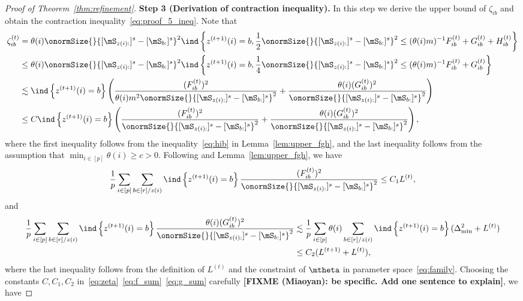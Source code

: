 \documentclass[lettersize,onecolumn,journal]{IEEEtran}
\theoremstyle{definition}
\theoremstyle{definition}
\newcommand{\of}[1]{\left(#1\right)}
\newcommand{\offf}[1]{\left\{#1\right\}}
\def\fixme#1#2{\textbf{\color{red}[FIXME (#1): #2]}}
\begin{document}
\begin{proof}[Proof of Theorem~\ref{thm:refinement}]
    {\bf Step 3 (Derivation of contraction inequality).} In this step we derive the upper bound of $\zeta_{ib}$ and obtain the contraction inequality~\eqref{eq:proof_5_ineq}. Note that 
    \begin{align}
        \zeta_{ib}^{(t)} &= \theta(i) \onormSize{}{ [ \mS_{ z(i):}  ]^s - [ \mS_{b:}  ]^s  }^2 \ind \offf{z^{(t+1)}(i) = b, \frac{1}{2}\onormSize{}{ [ \mS_{z(i):}  ]^s - [ \mS_{b:}  ]^s  }^2 \leq (\theta(i) m)^{-1} F_{ib}^{(t)} + G_{ib}^{(t)} + H_{ib}^{(t)} }\\
        & \leq \theta(i) \onormSize{}{ [ \mS_{ z(i):}  ]^s - [ \mS_{b:}  ]^s  }^2 \ind \offf{z^{(t+1)}(i) = b, \frac{1}{4}\onormSize{}{ [ \mS_{z(i):}  ]^s - [ \mS_{b:}  ]^s  }^2 \leq (\theta(i) m)^{-1} F_{ib}^{(t)} + G_{ib}^{(t)} } \\
        & \lesssim \ind \offf{ z^{(t+1)}(i) = b} \of{  \frac{(F_{ib}^{(t)})^2}{ \theta(i)m^2\onormSize{}{ [ \mS_{z(i):}  ]^s - [ \mS_{b:}  ]^s  }^2} + \frac{\theta(i)(G_{ib}^{(t)})^2}{ \onormSize{}{ [ \mS_{z(i):}  ]^s - [ \mS_{b:}  ]^s  }^2}    }\\
        &\leq C \ind \offf{ z^{(t+1)}(i) = b} \of{  \frac{(F_{ib}^{(t)})^2}{ \onormSize{}{ [ \mS_{z(i):}  ]^s - [ \mS_{b:}  ]^s  }^2} + \frac{\theta(i)(G_{ib}^{(t)})^2}{ \onormSize{}{ [ \mS_{z(i):}  ]^s - [ \mS_{b:}  ]^s  }^2}    },\label{eq:zeta}
    \end{align}
    where the first inequality follows from the inequality~\eqref{eq:hib} in Lemma~\ref{lem:upper_fgh}, and the last inequality follows from the assumption that $\min_{i \in [p]} \theta(i) \geq c>0$. Following \citet[Step 4, Proof of Theorem 2]{han2020exact} and Lemma~\ref{lem:upper_fgh}, we have 
    \begin{align}\label{eq:f_sum}
          \frac{1}{p} \sum_{i \in [p]}\sum_{b \in [r]/z(i)} \ind \offf{ z^{(t+1)}(i) = b} \frac{(F_{ib}^{(t)})^2}{ \onormSize{}{ [ \mS_{z(i):}  ]^s - [ \mS_{b:}  ]^s  }^2} \leq C_1 L^{(t)},
    \end{align}
    and 
    \begin{align}
         \frac{1}{p} \sum_{i \in [p]}\sum_{b \in [r]/z(i)} \ind \offf{ z^{(t+1)}(i) = b} \frac{\theta(i)(G_{ib}^{(t)})^2}{ \onormSize{}{ [ \mS_{z(i):}  ]^s - [ \mS_{b:}  ]^s  }^2}  &\lesssim \frac{1}{p} \sum_{i \in [p]}\theta(i) \sum_{b \in [r]/z(i)}   \ind \offf{ z^{(t+1)}(i) = b}  (\Delta_{\min}^2 + L^{(t)}) \\
         & \leq C_2 (L^{(t+1)} + L^{(t)}), \label{eq:g_sum}
    \end{align}
    where the last inequality follows from the definition of $L^{(t)}$ and the constraint of $\mtheta$ in parameter space~\eqref{eq:family}. Choosing the constants $C, C_1, C_2$ in~\eqref{eq:zeta}~\eqref{eq:f_sum}~\eqref{eq:g_sum} carefully \fixme{Miaoyan}{be specific. Add one sentence to explain}, we have 

\end{proof}
\end{document}
